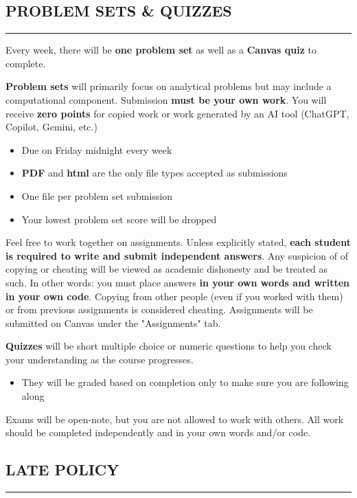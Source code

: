 \subsection*{PROBLEM SETS \& QUIZZES}
\vspace*{-0.5cm}
\rule{\textwidth}{2pt}

Every week, there will be \textbf{one problem set} as well as a \textbf{Canvas quiz} to complete.

\textbf{Problem sets} will primarily focus on analytical problems but may include a computational component. 
Submission \textbf{must be your own work}.
You will receive \textbf{zero points} for copied work or work generated by an AI tool (ChatGPT, Copilot, Gemini, etc.)

\begin{itemize}
    \item Due on Friday midnight every week
    \item \textbf{PDF} and \textbf{html} are the only file types accepted as submissions
    \item One file per problem set submission
    \item Your lowest problem set score will be dropped
\end{itemize}

Feel free to work together on assignments.
Unless explicitly stated, \textbf{each student is required to write and submit independent answers}.
Any suspicion of of copying or cheating will be viewed as academic dishonesty and be treated as such. 
In other words: you must place answers \textbf{in your own words and written in your own code}.
Copying from other people (even if you worked with them) or from previous assignments is considered cheating. 
Assignments will be submitted on Canvas under the "Assignments" tab. 

\textbf{Quizzes} will be short multiple choice or numeric questions to help you check your understanding as the course progresses. 
\begin{itemize}
    \item They will be graded based on completion only to make sure you are following along
\end{itemize}

Exams will be open-note, but you are not allowed to work with others. 
All work should be completed independently and in your own words and/or code.

\subsection*{LATE POLICY}
\vspace*{-0.5cm}
\rule{\textwidth}{2pt}

